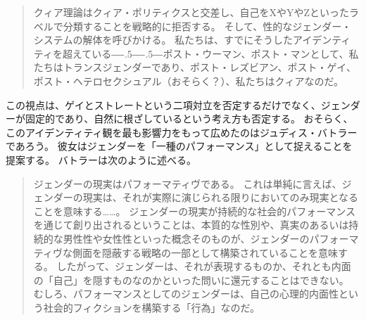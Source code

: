 \documentclass[paper=a4,book,openany]{jlreq}
\newcommand{\ig}[1]{}           %
\def\DDASH{―\kern-.5\zw―\kern-.5\zw―} %
\begin{document}
\begin{quote}
クィア理論はクィア・ポリティクスと交差し、自己をXやYやZといったラベルで分類することを戦略的に拒否する。
そして、性的なジェンダー・システムの解体を呼びかける。
私たちは、すでにそうしたアイデンティティを超えている{\DDASH}ポスト・ウーマン、ポスト・マンとして、私たちはトランスジェンダーであり、ポスト・レズビアン、ポスト・ゲイ、ポスト・ヘテロセクシュアル（おそらく？）、私たちはクィアなのだ。
\citep[p.38]{richardson00:_rethin_sexual}
\end{quote}

この視点は、ゲイとストレートという二項対立を否定するだけでなく、ジェンダーが固定的であり、自然に根ざしているという考え方も否定する。
おそらく、このアイデンティティ観を最も影響力をもって広めたのはジュディス・バトラー\ig{(Judith Butler)}であろう。
彼女はジェンダーを「一種のパフォーマンス」として捉えることを提案する。
バトラーは次のように述べる。

\begin{quote}
ジェンダーの現実はパフォーマティヴである。
これは単純に言えば、ジェンダーの現実は、それが実際に演じられる限りにおいてのみ現実となることを意味する……。
ジェンダーの現実が持続的な社会的パフォーマンスを通じて創り出されるということは、本質的な性別や、真実のあるいは持続的な男性性や女性性といった概念そのものが、ジェンダーのパフォーマティヴな側面を隠蔽する戦略の一部として構築されていることを意味する。
したがって、ジェンダーは、それが表現するものか、それとも内面の「自己」を隠すものなのかといった問いに還元することはできない。
むしろ、パフォーマンスとしてのジェンダーは、自己の心理的内面性という社会的フィクションを構築する「行為」なのだ。\citep[pp.527-528]{butler88:_perfor_acts_gender_const}

\end{quote}
\end{document}
